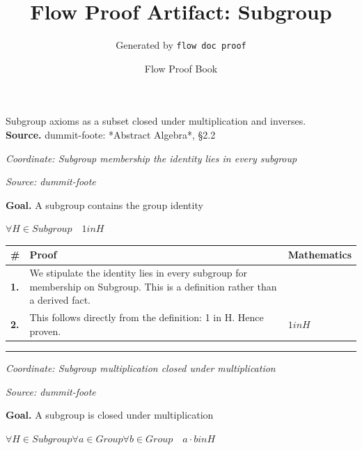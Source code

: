 \documentclass[11pt]{article}
\title{Flow Proof Artifact: Subgroup}
\author{Generated by \texttt{flow doc proof}}
\date{Flow Proof Book}
\theoremstyle{definition}
\begin{document}
\maketitle
Subgroup axioms as a subset closed under multiplication and inverses.\\[0.5em]
\textbf{Source.} dummit-foote: *Abstract Algebra*, §2.2\\[0.5em]
\bigskip
{}\par
\smallskip\noindent\textit{Coordinate: Subgroup \cdot membership \cdot the identity lies in every subgroup}\par
\smallskip\noindent\textit{Source: dummit-foote}\par
\medskip
\noindent\textbf{Goal.} A subgroup contains the group identity\par
\noindent$\displaystyle \forall H \in Subgroup\quad 1 in H$\par
\medskip
\noindent
\begin{tabular}{@{} >{\raggedright\arraybackslash}p{} >{\raggedright\arraybackslash}p{} >{\raggedleft\arraybackslash}p{} @{}}
\textbf{\#} & \textbf{Proof} & \textbf{Mathematics} \\
\midrule
\textbf{1.} & We stipulate the identity lies in every subgroup for membership on Subgroup. This is a definition rather than a derived fact. & \\[0.45em]
\textbf{2.} & This follows directly from the definition: 1 in H. Hence proven. & $\displaystyle 1 in H$ \\[0.45em]
\bottomrule
\end{tabular}
\label{thm:Subgroup-membership-the_identity_lies_in_every_subgroup}
\par\medskip\hrule
\bigskip
{}\par
\smallskip\noindent\textit{Coordinate: Subgroup \cdot multiplication \cdot closed under multiplication}\par
\smallskip\noindent\textit{Source: dummit-foote}\par
\medskip
\noindent\textbf{Goal.} A subgroup is closed under multiplication\par
\noindent$\displaystyle \forall H \in Subgroup \forall a \in Group \forall b \in Group\quad a \cdot b in H$\par
\end{document}
